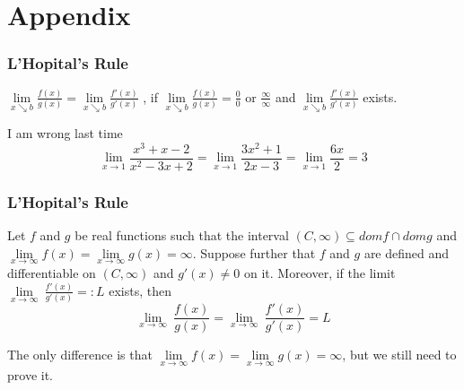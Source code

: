 \documentclass{beamer}
\begin{document}
\section{Appendix}

\begin{frame}
    \frametitle{L'Hopital's Rule}
    \begin{center}
    \vspace{1em}
     \large{$\underset{x\searrow b}{\lim}\frac{f(x)}{g(x)}=\underset{x\searrow b}{\lim}\frac{f'(x)}{g'(x)}$
    , if $\underset{x\searrow b}{\lim}\frac{f(x)}{g(x)}=\frac{0}{0}\text{ or }\frac{\infty}{\infty}$ and $\underset{x\searrow b}{\lim}\frac{f'(x)}{g'(x)}$ exists.}
    \end{center}
    \vspace{2em}
    \begin{block}{I am wrong last time}
        \begin{equation*}
            \underset{x\rightarrow 1}{\lim}\frac{x^3+x-2}{x^2-3x+2}=\underset{x\rightarrow 1}{\lim}\frac{3x^2+1}{2x-3}=\underset{x\rightarrow 1}{\lim}\frac{6x}{2}=3
        \end{equation*}
    \end{block}
    \vspace{1em}
\end{frame}


\begin{frame}
    \frametitle{L'Hopital's Rule}
    \hspace{1em}
Let $f$ and $g$ be real functions such that the interval $(C,\infty)\subseteq domf\cap domg$ and 
$\underset{x\rightarrow \infty }{\lim}f(x)=\underset{x\rightarrow \infty }{\lim}g(x)=\infty$. Suppose further that $f$ and $g$ are defined 
and differentiable on $(C,\infty)$ and $g'(x)\neq 0$ on it. Moreover, if the limit $\underset{x\rightarrow \infty }{\lim}\ \frac{f'(x)}{g'(x)}=:L$ exists, then 
\begin{equation*}
    \underset{x\rightarrow\infty}{\lim}\ \frac{f(x)}{g(x)}=\underset{x\rightarrow\infty}{\lim}\ \frac{f'(x)}{g'(x)}=L
\end{equation*}

\vspace{0.5em}
\hspace{1em}
The only difference is that $\underset{x\rightarrow\infty}{\lim}f(x)=\underset{x\rightarrow \infty }{\lim}g(x)=\infty$, but we still need to 
prove it. 

    
\end{frame}
\end{document}

